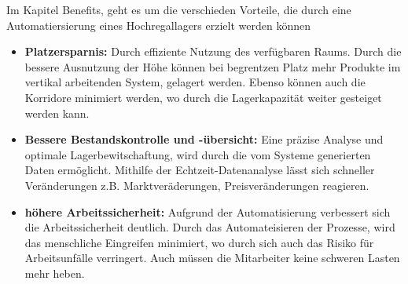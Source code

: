 Im Kapitel Benefits, geht es um die verschieden Vorteile, die durch eine Automatiersierung eines Hochregallagers erzielt werden können
\begin{itemize}
	\item \textbf{Platzersparnis:}
	Durch effiziente Nutzung des verfügbaren Raums. Durch die bessere Ausnutzung der Höhe können bei begrentzen Platz mehr Produkte im vertikal arbeitenden System, gelagert werden. Ebenso können auch die Korridore minimiert werden, wo durch die Lagerkapazität weiter gesteiget werden kann.
	\autocite{frazelle2002}
	\item \textbf{Bessere Bestandskontrolle und -übersicht:}
	Eine präzise Analyse und optimale Lagerbewitschaftung, wird durch die vom Systeme generierten Daten ermöglicht. Mithilfe der Echtzeit-Datenanalyse lässt sich schneller Veränderungen z.B. Marktveräderungen, Preisveränderungen reagieren. \autocite{Gunasekaran2015}
	\item \textbf{höhere Arbeitssicherheit:}
	Aufgrund der Automatisierung verbessert sich die Arbeitssicherheit deutlich. Durch das Automateisieren der  Prozesse, wird das menschliche Eingreifen minimiert, wo durch sich auch das Risiko für Arbeitsunfälle verringert. Auch müssen die Mitarbeiter keine schweren Lasten mehr heben. \autocite{kelle2019safety}

\end{itemize}
